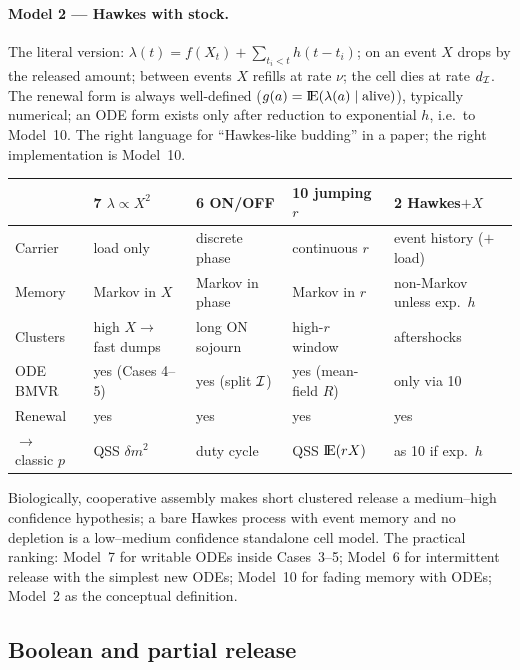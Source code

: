 \paragraph{Model 2 --- Hawkes with stock.} The literal version:
$\lambda(t)=f(X_t)+\sum_{t_i<t}h(t-t_i)$; on an event $X$ drops by the
released amount; between events $X$ refills at rate $\nu$; the cell dies at
rate $d_{\mathcal{I}}$. The renewal form is always well-defined
($g(a)={\rm I}\!{\rm E}(\lambda(a)\mid\text{alive})$), typically numerical; an ODE
form exists only after reduction to exponential $h$, i.e.\ to
Model~10. The right language for ``Hawkes-like budding'' in a paper; the
right implementation is Model~10.

\begin{center}
\renewcommand{\arraystretch}{1.2}
\small
\begin{tabular}{@{}p{}p{}p{}p{}p{}@{}}
\toprule
 & \textbf{7} $\lambda\propto X^2$ & \textbf{6} ON/OFF & \textbf{10} jumping $r$ & \textbf{2} Hawkes$+X$ \\
\midrule
Carrier & load only & discrete phase & continuous $r$ & event history ($+$load) \\
Memory & Markov in $X$ & Markov in phase & Markov in $r$ & non-Markov unless exp.\ $h$ \\
Clusters & high $X\to$ fast dumps & long ON sojourn & high-$r$ window & aftershocks \\
ODE BMVR & yes (Cases 4--5) & yes (split $\mathcal{I}$) & yes (mean-field $R$) & only via 10 \\
Renewal & yes & yes & yes & yes \\
$\to$ classic $p$ & QSS $\delta m^2$ & duty cycle & QSS ${\rm I}\!{\rm E}(rX)$ & as 10 if exp.\ $h$ \\
\bottomrule
\end{tabular}
\end{center}
Biologically, cooperative assembly makes short clustered release a
medium--high confidence hypothesis; a bare Hawkes process with event memory
and no depletion is a low--medium confidence standalone cell model. The
practical ranking: Model~7 for writable ODEs inside Cases~3--5; Model~6 for
intermittent release with the simplest new ODEs; Model~10 for fading memory
with ODEs; Model~2 as the conceptual definition.

\subsection{Boolean and partial release}
\label{sec:boolean}

